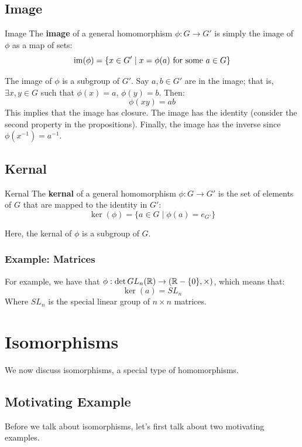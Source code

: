 \documentclass[letterpaper]{article}
\begin{document}
\subsection{Image}
\begin{definition}{Image}{}
    The \textbf{image} of a general homomorphism $\phi: G \to G'$ is simply the image of $\phi$ as a map of sets: 
    \[\operatorname{im}(\phi) = \{x \in G' \mid x = \phi(a) \text{ for some } a \in G\}\]
\end{definition}
The image of $\phi$ is a subgroup of $G'$. Say $a, b \in G'$ are in the image; that is, $\exists x, y \in G$ such that $\phi(x) = a$, $\phi(y) = b$. Then: 
\[\phi(xy) = ab\]
This implies that the image has closure. The image has the identity (consider the second property in the propositions). Finally, the image has the inverse since $\phi(x^{-1}) = a^{-1}$. 

\subsection{Kernal}
\begin{definition}{Kernal}{}
    The \textbf{kernal} of a general homomorphism $\phi: G \to G'$ is the set of elements of $G$ that are mapped to the identity in $G'$: 
    \[\ker(\phi) = \{a \in G \mid \phi(a) = e_{G'}\}\]
\end{definition}
Here, the kernal of $\phi$ is a subgroup of $G$. 


\subsubsection{Example: Matrices}
For example, we have that $\phi: \det GL_n (\mathbb{R}) \to (\mathbb{R} - \{0\}, \times)$, which means that: 
\[\ker(a) = SL_n\]
Where $SL_n$ is the special linear group of $n \times n$ matrices. 











\newpage 
\section{Isomorphisms}
We now discuss isomorphisms, a special type of homomorphisms.

\subsection{Motivating Example}
Before we talk about isomorphisms, let's first talk about two motivating examples. 
\end{document}
